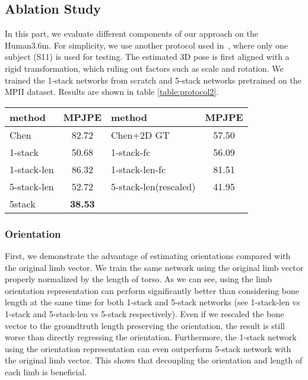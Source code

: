 \documentclass{bmvc2k}
\begin{document}
\subsection{Ablation Study}
In this part, we evaluate different components of our approach on the Human3.6m. For simplicity, we use another protocol used in~\cite{yasin2016dual,rogez2016mocap,chen20163d}, where only one subject (S11) is used for testing. The estimated 3D pose is first aligned with a rigid transformation, which ruling out factors such as scale and rotation. We trained the 1-stack networks from scratch and 5-stack networks pretrained on the MPII dataset. Results are shown in table \ref{table:protocol2}.
\begin{table*}[h]
	\begin{center}
		\tabcolsep=0.07cm
		\begin{tabular}{|l|c||l|c|}
			\hline
   method & MPJPE & method & MPJPE \\ \hline
Chen\cite{chen20163d} &  82.72 &   Chen\cite{chen20163d}+2D GT  & 57.50 \\ \hline
			1-stack &  50.68 & 1-stack-fc & 56.09 \\
			1-stack-len  &  86.32 & 1-stack-len-fc & 81.51 \\ \hline
5-stack-len & 52.72 & 5-stack-len(rescaled) &41.95 \\
			5stack &  \textbf{38.53} & & \\ \hline
		\end{tabular}
	\end{center}
	\caption{The mean reconstruction errors on Human3.6M (S11). Errors are computed after Procrustes alignment. ``fc'' means sparse representation with a fully connected layer at the end. ``len'' means using the properly normalized limb vector instead of orientations. ``Rescaled'' means rescaled each bone to the groundtruth length during testing.}
	\label{table:protocol2}
\end{table*}
\subsubsection{Orientation}
First, we demonstrate the advantage of estimating orientations compared with the original limb vector. 
We train the same network using the original limb vector properly normalized by the length of torso.  As we can see, using the limb orientation representation can perform significantly better than considering bone length at the same time for both 1-stack and 5-stack networks (see 1-stack-len vs 1-stack and 5-stack-len vs 5-stack respectively). Even if we rescaled the bone vector to the groundtruth length preserving the orientation, the result is still worse than directly regressing the orientation. Furthermore, the 1-stack network using the orientation representation can even outperform 5-stack network with the original limb vector. This shows that decoupling the orientation and length of each limb is beneficial.
\end{document}
